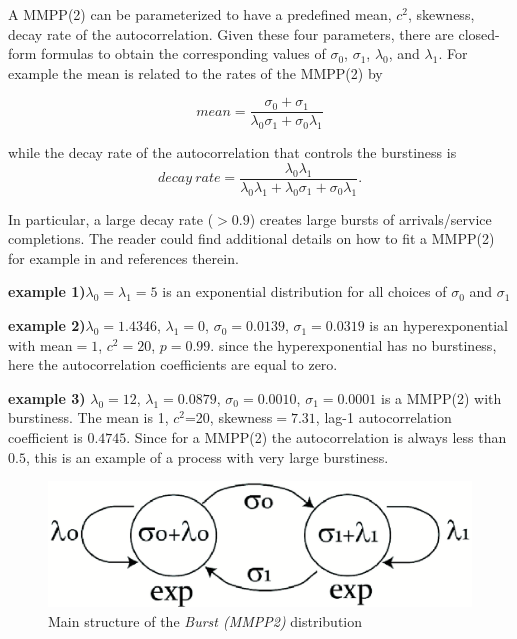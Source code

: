 A MMPP(2) can be parameterized to have a predefined mean, $c^2$, skewness, decay rate of the autocorrelation. Given these four parameters, there are closed-form formulas to obtain the corresponding values
of  $\sigma_0$,  $\sigma_1$, $\lambda_0$, and $\lambda_1$. For example the mean is
related to the rates of the MMPP(2) by

\[mean=\frac{\sigma_0+\sigma_1}{\lambda_0\sigma_1+\sigma_0\lambda_1}\]

while the decay rate of the autocorrelation that controls the burstiness is
\[
decay~rate=\frac{\lambda_0\lambda_1}{\lambda_0\lambda_1+\lambda_0\sigma_1+\sigma_0\lambda_1}.
\]

In particular, a large decay rate ($>0.9$) creates large bursts of arrivals/service completions.
The reader could find additional details on how to fit a MMPP(2) for example in \cite{CasZS07} and references therein.

\textbf{example 1)}$\lambda_0=\lambda_1=5$ is an exponential distribution for all
choices of $\sigma_0$ and $\sigma_1$

\textbf{example 2)}$\lambda_0=1.4346$, $\lambda_1=0$, $\sigma_0=0.0139$, $\sigma_1=0.0319$
is an hyperexponential with mean$=1$, $c^2=20$, $p=0.99$. since the
hyperexponential has no burstiness, here the autocorrelation
coefficients are equal to zero.

\textbf{example 3)} $\lambda_0=12$, $\lambda_1=0.0879$, $\sigma_0=0.0010$,
$\sigma_1=0.0001$ is a MMPP(2) with burstiness. The mean is 1, $c^2$=20,
skewness$=7.31$, lag-1 autocorrelation coefficient is $0.4745$. Since for
a MMPP(2) the autocorrelation is always less than $0.5$, this is an
example of a process with very large burstiness.

\begin{figure}[htb]
    \begin{center}
        \includegraphics[scale=.5]{img/jsimg/mmpp2.eps}
    \end{center}
    \caption{Main structure of the \emph{Burst (MMPP2)} distribution}
    \label{fig:mmpp2}
\end{figure}

